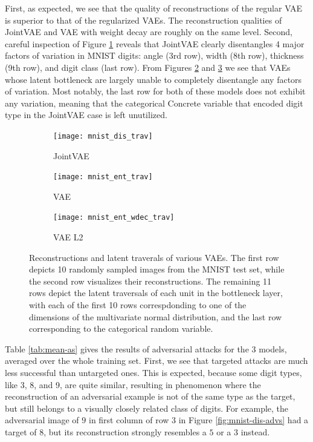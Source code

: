 \documentclass{report}
\begin{document}
\noindent First, as expected, we see that the quality of reconstructions of the regular VAE is superior to that of the regularized VAEs. The reconstruction qualities of JointVAE and VAE with weight decay are roughly on the same level. Second, careful inspection of Figure \ref{fig:lat-trav-dis} reveals that JointVAE clearly disentangles 4 major factors of variation in MNIST digits: angle (3rd row), width (8th row), thickness (9th row), and digit class (last row). From Figures \ref{fig:lat-trav-ent} and \ref{fig:lat-trav-wdec} we see that VAEs whose latent bottleneck are largely unable to completely disentangle any factors of variation. Most notably, the last row for both of these models does not exhibit any variation, meaning that the categorical Concrete variable that encoded digit type in the JointVAE case is left unutilized. \\

\begin{figure}[H]
\begin{subfigure}{.48\textwidth}
  \centering
  \texttt{[image: mnist\_dis\_trav]}
  \caption{JointVAE}
  \label{fig:lat-trav-dis}
\end{subfigure}%
\begin{subfigure}{.48\textwidth}
  \centering
  \texttt{[image: mnist\_ent\_trav]}
  \caption{VAE}
  \label{fig:lat-trav-ent}
\end{subfigure}
\begin{subfigure}{.48\textwidth}
  \centering
  \texttt{[image: mnist\_ent\_wdec\_trav]}
  \caption{VAE L2}
  \label{fig:lat-trav-wdec}
\end{subfigure}
\caption{Reconstructions and latent traverals of various VAEs. The first row depicts 10 randomly sampled images from the MNIST test set, while the second row visualizes their reconstructions. The remaining 11 rows depict the latent traversals of each unit in the bottleneck layer, with each of the first 10 rows correspdonding to one of the dimensions of the multivariate normal distribution, and the last row corresponding to the categorical random variable.}
\label{fig:lat-trav}
\end{figure}

\noindent Table \ref{tab:mean-as} gives the results of adversarial attacks for the 3 models, averaged over the whole training set. First, we see that targeted attacks are much less successful than untargeted ones. This is expected, because some digit types, like 3, 8, and 9, are quite similar, resulting in phenomenon where the reconstruction of an adversarial example is not of the same type as the target, but still belongs to a visually closely related class of digits. For example, the adversarial image of $9$ in first column of row $3$ in Figure \ref{fig:mnist-dis-advs} had a target of $8$, but its reconstruction strongly resembles a $5$ or a $3$ instead. \\ 
\end{document}

